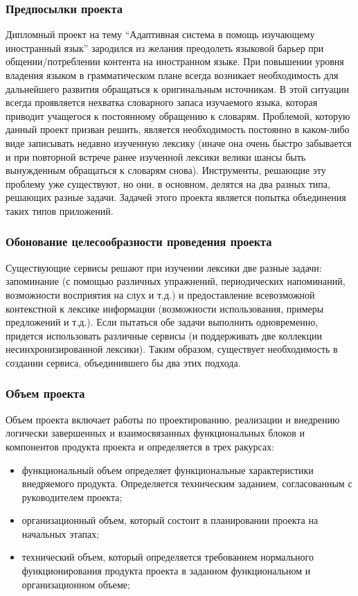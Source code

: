 \documentclass[a4paper,14pt]{extarticle}
\begin{document}
\subsubsection{Предпосылки проекта}
Дипломный проект на тему \enquote{Адаптивная система в помощь изучающему
иностранный язык} зародился из желания преодолеть языковой барьер при
общении/потреблении контента на иностранном языке. При повышении уровня владения
языком в грамматическом плане всегда возникает необходимость для дальнейшего
развития обращаться к оригинальным источникам. В этой ситуации всегда
проявляется нехватка словарного запаса изучаемого языка, которая приводит
учащегося к постоянному обращению к словарям. Проблемой, которую данный проект
призван решить, является необходимость постоянно в каком-либо виде записывать
недавно изученную лексику (иначе она очень быстро забывается и при повторной
встрече ранее изученной лексики велики шансы быть вынужденным обращаться к
словарям снова). Инструменты, решающие эту проблему уже существуют, но они, в
основном, делятся на два разных типа, решающих разные задачи. Задачей этого
проекта является попытка объединения таких типов приложений.

\subsubsection{Обонование целесообразности проведения проекта}
Существующие сервисы решают при изучении лексики две разные задачи: запоминание
(с помощью различных упражнений, периодических напоминаний, возможности
восприятия на слух и т.д.) и предоставление всевозможной контекстной к лексике
информации (возможности использования, примеры предложений и т.д.). Если
пытаться обе задачи выполнить одновременно, придется использовать различные
сервисы (и поддерживать две коллекции несинхронизированной лексики). Таким
образом, существует необходимость в создании сервиса, объединившего бы два этих
подхода.

\subsubsection{Объем проекта}
Объем проекта включает работы по проектированию, реализации и внедрению
логически завершенных и взаимосвязанных функциональных блоков и компонентов
продукта проекта и определяется в трех ракурсах:

\begin{itemize}
    \item функциональный объем определяет функциональные характеристики\\
          внедряемого продукта. Определяется техническим заданием, согласованным с
          руководителем проекта;
    \item организационный объем, который состоит в планировании проекта на
          начальных этапах;
    \item технический объем, который определяется требованием нормального\\
          функционирования продукта проекта в заданном функциональном и
          организационном объеме;
\end{itemize}
\end{document}
